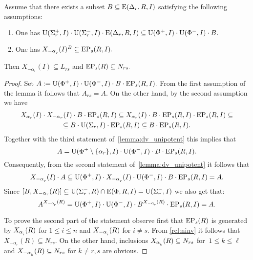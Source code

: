 \begin{lemma}\label{lemma:Stein_reduction}
Assume that there exists a subset $B \subseteq \operatorname{E}(\Delta_r, R, I)$ satisfying the following assumptions:
\begin{enumerate}
 \item\label{stein_cond1} One has $\operatorname{U}(\Sigma^+_r, I)\cdot \operatorname{U}(\Sigma^-_r, I) \cdot \operatorname{E}(\Delta_r, R, I) \subseteq \operatorname{U}(\Phi^+, I)\cdot \operatorname{U}(\Phi^-, I) \cdot B.$
 \item\label{stein_cond2} One has $X_{-\alpha\ssub{r}}(I)^B \subseteq \EP_s(R, I).$
\end{enumerate}
Then $X_{-\alpha_r}(I) \subseteq L_{rs}$ and $\operatorname{EP}_s(R) \subseteq N_{rs}.$
\end{lemma}
\begin{proof} Set $A:=\operatorname{U}(\Phi^+, I)\cdot \operatorname{U}(\Phi^-, I) \cdot B \cdot \operatorname{EP}_s(R, I).$
From the first assumption of the lemma it follows that $A_{rs}=A$.
On the other hand, by the second assumption we have
\begin{multline*} X_{\alpha_r}(I) \cdot X_{-\alpha_r}(I) \cdot B \cdot \operatorname{EP}_s(R, I) \subseteq 
 X_{\alpha_r}(I) \cdot B \cdot \operatorname{EP}_s(R, I) \cdot \operatorname{EP}_s(R, I) \subseteq \\
 \subseteq B \cdot \operatorname{U}(\Sigma_r, I) \cdot \operatorname{EP}_s(R, I) \subseteq 
 B \cdot \operatorname{EP}_s(R, I). \end{multline*}
Together with the third statement of~\cref{lemma:dv_unipotent} this implies that
\begin{equation} \label{rel:sred} A = \operatorname{U}(\Phi^+\setminus\{\alpha_r\}, I) \cdot \operatorname{U}(\Phi^-, I) \cdot B \cdot \operatorname{EP}_s(R, I). \end{equation}
Consequently, from the second statement of~\cref{lemma:dv_unipotent} it follows that
\begin{equation} \label{rel:linv} X_{-\alpha\ssub{r}}(I) \cdot A \subseteq \U(\Phi^+, I) \cdot X_{-\alpha\ssub{r}}(I) \cdot \U(\Phi^-, I) \cdot B \cdot \EP_s(R, I) = A. \end{equation}
Since $[B, X_{-\alpha_r}(R)] \subseteq \operatorname{U}(\Sigma_r^-, R) \cap \operatorname{E}(\Phi, R, I) = \operatorname{U}(\Sigma_r^-, I)$ we also get that:
\begin{equation} \label{rel:ninv} A^{X_{-\alpha\ssub{r}}(R)} = \U(\Phi^+, I) \cdot \U(\Phi^-, I) \cdot B ^{X_{-\alpha\ssub{r}}(R)} \cdot \EP_s(R, I) = A. \end{equation}

To prove the second part of the statement observe first that $\operatorname{EP}_s(R)$ is generated by $X_{\alpha\ssub{i}}(R)$ for $1\leqslant i\leqslant n$ and $X_{-\alpha\ssub{i}}(R)$ for $i\neq s$.
From \ref{rel:ninv} it follows that $X_{-\alpha_r}(R)\subseteq N_{rs}$.
On the other hand, inclusions $X_{\alpha\ssub{k}}(R) \subseteq N_{rs}$ for $\ 1\leqslant k\leqslant \ell$ and $X_{-\alpha\ssub{k}}(R) \subseteq N_{rs}$ for $k\neq r,s$ are obvious.
\end{proof}

